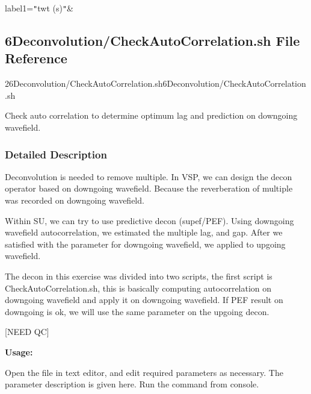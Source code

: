 \documentclass{article}
\begin{document}
\vspace{4pt}
\parindent=0pt
label1=\texttt{"}twt (s)\texttt{"}\&

\vspace{12pt}
\subsection*{{\large{}\textbf{6Deconvolution/CheckAutoCorrelation.sh File Reference}}}

\vspace{12pt}
26Deconvolution/CheckAutoCorrelation.sh6Deconvolution/CheckAutoCorrelation.sh\label{AAAAAAAAAO}

\vspace{12pt}
Check auto correlation to determine optimum lag and prediction on downgoing wavefield. 

\vspace{24pt}
\subsubsection*{\textbf{Detailed Description}}

\vspace{1pt}
Deconvolution is needed to remove multiple. In VSP, we can design the decon operator 
based on downgoing wavefield. Because the reverberation of multiple was recorded 
on downgoing wavefield. 

\vspace{1pt}
Within SU, we can try to use predictive decon (supef/PEF). Using downgoing wavefield 
autocorrelation, we estimated the multiple lag, and gap. After we satisfied with 
the parameter for downgoing wavefield, we applied to upgoing wavefield.

\vspace{1pt}
The decon in this exercise was divided into two scripts, the first script is CheckAutoCorrelation.sh, 
this is basically computing autocorrelation on downgoing wavefield and apply it 
on downgoing wavefield. If PEF result on downgoing is ok, we will use the same 
parameter on the upgoing decon. 

\vspace{1pt}
[NEED QC]

\vspace{4pt}
\textbf{Usage:}

\vspace{4pt}
Open the file in text editor, and edit required parameters as necessary. The parameter 
description is given here. Run the command from console. 
\end{document}
